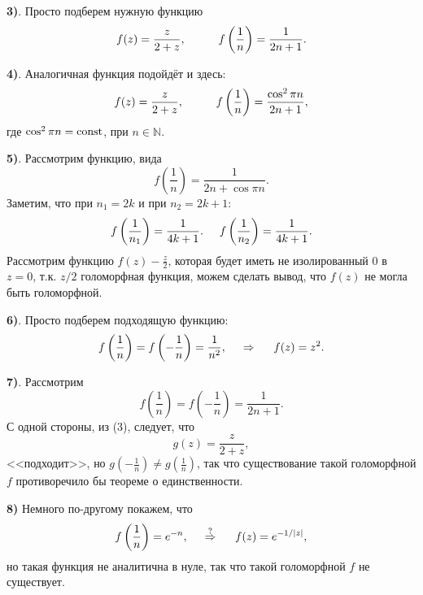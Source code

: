 \textbf{3)}. Просто подберем нужную функцию
\begin{equation*}
    f(z) = \frac{z}{2 + z}, 
    \hspace{10 mm} 
    f\left(\frac{1}{n}\right) = \frac{1}{2n  +1}. 
\end{equation*}

\textbf{4)}. Аналогичная функция подойдёт и здесь:
\begin{equation*}
    f(z) = \frac{z}{2 + z},
    \hspace{10 mm} 
    f\left(\frac{1}{n}\right) = \frac{\cos^2 \pi n}{2 n + 1},
\end{equation*}
где $\cos^2 \pi n = \textnormal{const}$, при $n \in \mathbb{N}$.

\textbf{5)}. Рассмотрим функцию, вида
\begin{equation*}
    f\left(\frac{1}{n}\right) = \frac{1}{2n + \cos \pi n}.
\end{equation*}
Заметим, что при $n_1 = 2k$ и при $n_2 = 2k + 1$:
\begin{equation*}
    f\left(\frac{1}{n_1}\right) = \frac{1}{4k+1}.
    \hspace{5 mm} 
    f\left(\frac{1}{n_2}\right) = \frac{1}{4k+1}.
\end{equation*}
Рассмотрим функцию $f(z) - \frac{z}{2}$, которая будет иметь не изолированный 0 в $z = 0$, т.к. $z/2$ голоморфная функция, можем сделать вывод, что $f(z)$ не могла быть голоморфной.


\textbf{6)}. Просто подберем подходящую функцию:
\begin{equation*}
    f\left(\frac{1}{n}\right) = f\left(- \frac{1}{n}\right) = \frac{1}{n^2},
    \hspace{0.5cm} \Rightarrow \hspace{0.5cm}
    f(z) = z^2.
\end{equation*}

\textbf{7)}. Рассмотрим
\begin{equation*}
    f\left(\frac{1}{n}\right) = f\left(-\frac{1}{n}\right) = \frac{1}{2n + 1}.
\end{equation*}
С одной стороны, из (3), следует, что
\begin{equation*}
    g(z) = \frac{z}{2 + z},
\end{equation*}
<<подходит>>, но $g\left(- \frac{1}{n}\right) \neq g \left(\frac{1}{n}\right)$, так что существование такой голоморфной $f$ противоречило бы теореме о единственности. 


\textbf{8)} Немного по-другому покажем, что
\begin{equation*}
    f\left(\frac{1}{n}\right) = e^{-n},
    \hspace{0.5cm} \overset{?}{\Rightarrow}  \hspace{0.5cm}
    f(z) = e^{-1/|z|},
\end{equation*}
но такая функция не аналитична в нуле, так что такой голоморфной $f$ не существует.



